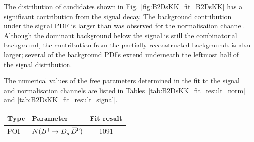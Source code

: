 The distribution of \decay{\Bp}{\Dsp\Kp\Km} candidates shown in Fig.~\ref{fig:B2DsKK_fit_B2DsKK} has a significant contribution from the signal decay. The background contribution under the signal PDF is larger than was observed for the normalisation channel. Although the dominant background below the signal is still the combinatorial background, the contribution from the partially reconstructed backgrounds is also larger; several of the background PDFs extend underneath the leftmost half of the signal distribution.  


The numerical values of the free parameters determined in the fit to the signal and normalisation channels are listed in Tables~\ref{tab:B2DsKK_fit_result_norm} and \ref{tab:B2DsKK_fit_result_signal}.

\begin{table}[h]
    \centering
    \begin{tabular}{ l l S[table-format=4.1(3)] }
        \hline
        Type       & Parameter                                 & {Fit result}                         \\
        \hline
        POI         & $N({{{B}^+}}\!\rightarrow {\ensuremath{{D}^+_{s}}}{\ensuremath{{\kern 0.2em\overline{\kern -0.2em D}{}}{}^0}})$               & 1091                \\


\end{tabular}
\end{table}
